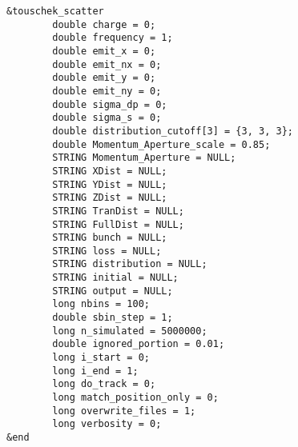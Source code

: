 \documentclass[11pt]{article}
\begin{document}
\begin{verbatim}
&touschek_scatter
        double charge = 0;
        double frequency = 1;
        double emit_x = 0;
        double emit_nx = 0;
        double emit_y = 0;
        double emit_ny = 0;
        double sigma_dp = 0;
        double sigma_s = 0;
        double distribution_cutoff[3] = {3, 3, 3};
        double Momentum_Aperture_scale = 0.85;
        STRING Momentum_Aperture = NULL;
        STRING XDist = NULL;
        STRING YDist = NULL;
        STRING ZDist = NULL;
        STRING TranDist = NULL;
        STRING FullDist = NULL;
        STRING bunch = NULL;
        STRING loss = NULL;
        STRING distribution = NULL;
        STRING initial = NULL;
        STRING output = NULL;
        long nbins = 100;
        double sbin_step = 1;
        long n_simulated = 5000000;
        double ignored_portion = 0.01;
        long i_start = 0;
        long i_end = 1;
        long do_track = 0;
        long match_position_only = 0;
        long overwrite_files = 1;
        long verbosity = 0;
&end
\end{verbatim}
\end{document}
